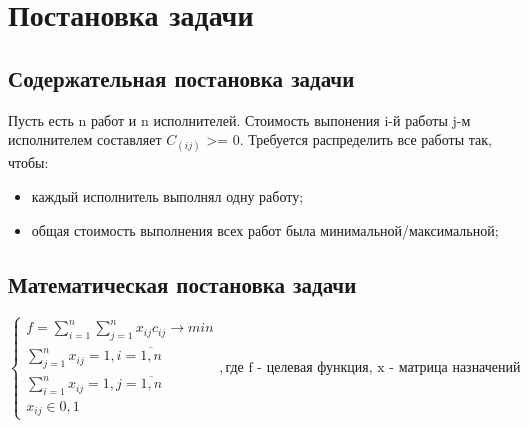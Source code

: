 
\section{Постановка задачи}

\subsection{Содержательная постановка задачи}

Пусть есть n работ и n исполнителей. Стоимость выпонения i-й работы j-м исполнителем 
составляет $C_(ij)$ >= 0. Требуется распределить все работы так, чтобы:

\begin{itemize}
    \item каждый исполнитель выполнял одну работу;
    \item общая стоимость выполнения всех работ была минимальной/максимальной;
\end{itemize}

\subsection{Математическая постановка задачи}

\begin{equation*}
    \begin{cases}
        f = \sum_{i=1}^{n}\sum_{j=1}^{n}x_{ij}c_{ij} \rightarrow min\\      
        \sum_{j=1}^{n}x_{ij} = 1, i=\overline{1,n}\\
        \sum_{i=1}^{n}x_{ij} = 1, j=\overline{1,n}\\
        x_{ij} \in {0,1}
    \end{cases},
    \text{где f - целевая функция, x - матрица назначений}
\end{equation*}